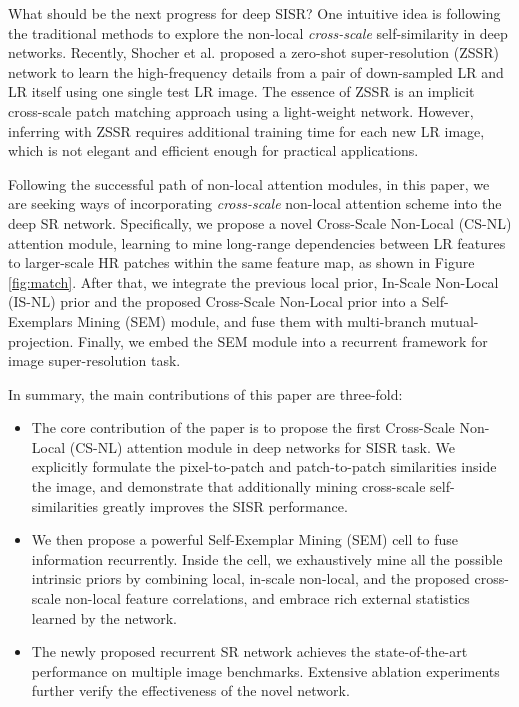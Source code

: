 \documentclass[10pt,twocolumn,letterpaper]{article}
\begin{document}
What should be the next progress for deep SISR? One intuitive idea is following the traditional methods to explore the non-local \textit{cross-scale} self-similarity in deep networks. Recently, Shocher et al. \cite{shocher2018zero} proposed a zero-shot super-resolution (ZSSR) network to learn the high-frequency details from a pair of down-sampled LR and LR itself using one single test LR image. The essence of ZSSR is an implicit cross-scale patch matching approach using a light-weight network. However, inferring with ZSSR requires additional training time for each new LR image, which is not elegant and efficient enough for practical applications.



Following the successful path of non-local attention modules, in this paper, we are seeking ways of incorporating \textit{cross-scale} non-local attention scheme into the deep SR network. Specifically, we propose a novel Cross-Scale Non-Local (CS-NL) attention module, learning to mine long-range dependencies between LR features to larger-scale HR patches within the same feature map, as shown in Figure \ref{fig:match}. After that, we integrate the previous local prior, In-Scale Non-Local (IS-NL) prior and the proposed Cross-Scale Non-Local prior into a Self-Exemplars Mining (SEM) module, and fuse them with multi-branch mutual-projection. Finally, we embed the SEM module into a recurrent framework for image super-resolution task.












In summary, the main contributions of this paper are three-fold:
\begin{itemize}
    \item The core contribution of the paper is to propose the first Cross-Scale Non-Local (CS-NL) attention module in deep networks for SISR task. We explicitly formulate the pixel-to-patch and patch-to-patch similarities inside the image, and demonstrate that additionally mining cross-scale self-similarities greatly improves the SISR performance.
    \item We then propose a powerful Self-Exemplar Mining (SEM) cell to fuse information recurrently. Inside the cell, we exhaustively mine all the possible intrinsic priors by combining local, in-scale non-local, and the proposed cross-scale non-local feature correlations, and embrace rich external statistics learned by the network.
    \item The newly proposed recurrent SR network achieves the state-of-the-art performance on multiple image benchmarks. Extensive ablation experiments further verify the effectiveness of the novel network.
\end{itemize} 
\end{document}
